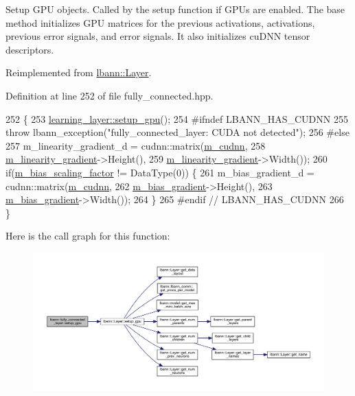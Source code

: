Setup G\+PU objects. Called by the setup function if G\+P\+Us are enabled. The base method initializes G\+PU matrices for the previous activations, activations, previous error signals, and error signals. It also initializes cu\+D\+NN tensor descriptors. 

Reimplemented from \hyperlink{classlbann_1_1Layer_a36aa22ef90ce4de65abe729d38490863}{lbann\+::\+Layer}.



Definition at line 252 of file fully\+\_\+connected.\+hpp.


\begin{DoxyCode}
252                             \{
253     \hyperlink{classlbann_1_1Layer_a36aa22ef90ce4de65abe729d38490863}{learning\_layer::setup\_gpu}();
254 \textcolor{preprocessor}{#ifndef LBANN\_HAS\_CUDNN}
255     \textcolor{keywordflow}{throw} lbann\_exception(\textcolor{stringliteral}{"fully\_connected\_layer: CUDA not detected"});
256 \textcolor{preprocessor}{#else}
257     m\_linearity\_gradient\_d = cudnn::matrix(\hyperlink{classlbann_1_1Layer_a08dbb94239e3b8c96329786c57c72e21}{m\_cudnn},
258                                            \hyperlink{classlbann_1_1fully__connected__layer_ab80f9cb94662ce4d90aa6d8b5cfa0803}{m\_linearity\_gradient}->Height(),
259                                            \hyperlink{classlbann_1_1fully__connected__layer_ab80f9cb94662ce4d90aa6d8b5cfa0803}{m\_linearity\_gradient}->Width());
260     \textcolor{keywordflow}{if}(\hyperlink{classlbann_1_1fully__connected__layer_ae02eaffd5528bf572883f8b06d1b40c0}{m\_bias\_scaling\_factor} != DataType(0)) \{
261       m\_bias\_gradient\_d = cudnn::matrix(\hyperlink{classlbann_1_1Layer_a08dbb94239e3b8c96329786c57c72e21}{m\_cudnn},
262                                         \hyperlink{classlbann_1_1fully__connected__layer_a6510917c573378f40789a1d16db22b4e}{m\_bias\_gradient}->Height(),
263                                         \hyperlink{classlbann_1_1fully__connected__layer_a6510917c573378f40789a1d16db22b4e}{m\_bias\_gradient}->Width());
264     \}
265 \textcolor{preprocessor}{#endif // LBANN\_HAS\_CUDNN}
266   \}
\end{DoxyCode}
Here is the call graph for this function\+:\nopagebreak
\begin{figure}[H]
\begin{center}
\leavevmode
\includegraphics[width=350pt]{classlbann_1_1fully__connected__layer_a95c96742a67f2e9398e608b244c2d121_cgraph}
\end{center}
\end{figure}
